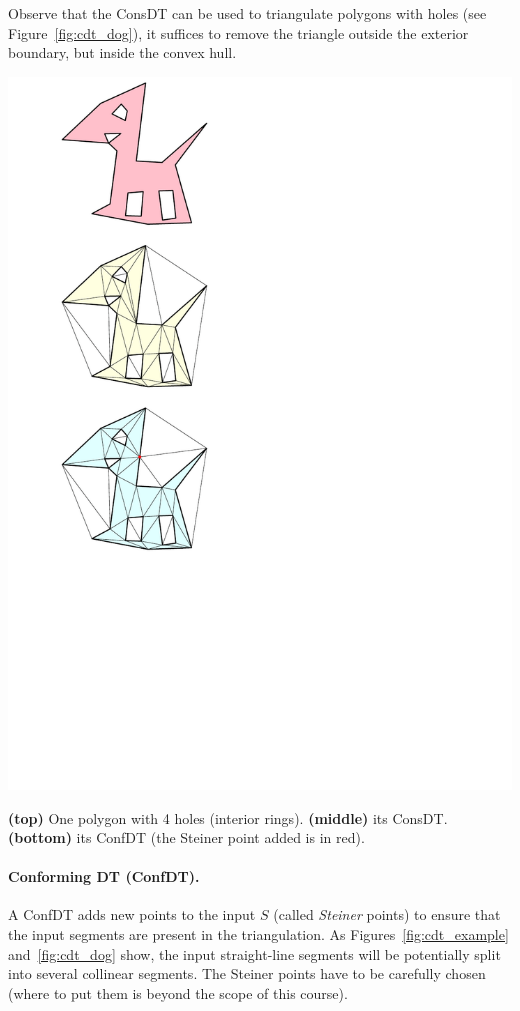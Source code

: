 %

Observe that the ConsDT can be used to triangulate polygons with holes (see Figure~\ref{fig:cdt_dog}), it suffices to remove the triangle outside the exterior boundary, but inside the convex hull.
\begin{marginfigure}
  \centering
  \includegraphics[width=0.8\linewidth]{figs/cdt_dog}
  \caption{\textbf{(top)} One polygon with 4 holes (interior rings). \textbf{(middle)} its ConsDT\@. \textbf{(bottom)} its ConfDT (the Steiner point added is in red).}%
\label{fig:cdt_dog}
\end{marginfigure}


%
\paragraph*{Conforming DT (ConfDT).}
A ConfDT adds new points to the input $S$ (called \emph{Steiner} points) to ensure that the input segments are present in the triangulation.%
As Figures~\ref{fig:cdt_example} and~\ref{fig:cdt_dog} show, the input straight-line segments will be potentially split into several collinear segments. 
The Steiner points have to be carefully chosen (where to put them is beyond the scope of this course).

